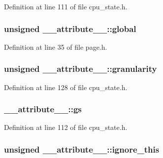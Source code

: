 \-Definition at line 111 of file cpu\-\_\-state.\-h.

\hypertarget{struct____attribute_____a64b47dff3d08e4138ce9523711ef1545}{
\subsubsection[{global}]{\setlength{\rightskip}{0pt plus 5cm}unsigned {\bf \-\_\-\-\_\-attribute\-\_\-\-\_\-\-::global}}}\label{struct____attribute_____a64b47dff3d08e4138ce9523711ef1545}


\-Definition at line 35 of file page.\-h.

\hypertarget{struct____attribute_____a06f6a9bd6e4fe0906fcc761fcba8a4e3}{
\subsubsection[{granularity}]{\setlength{\rightskip}{0pt plus 5cm}unsigned {\bf \-\_\-\-\_\-attribute\-\_\-\-\_\-\-::granularity}}}\label{struct____attribute_____a06f6a9bd6e4fe0906fcc761fcba8a4e3}


\-Definition at line 128 of file cpu\-\_\-state.\-h.

\hypertarget{struct____attribute_____a5a69d4f666af68d62d2bee047c2b534c}{
\subsubsection[{gs}]{ {\bf \-\_\-\-\_\-attribute\-\_\-\-\_\-\-::gs}}}\label{struct____attribute_____a5a69d4f666af68d62d2bee047c2b534c}


\-Definition at line 112 of file cpu\-\_\-state.\-h.

\hypertarget{struct____attribute_____a097e9473ec96eac6c0e467f6b5f21cca}{
\subsubsection[{ignore\-\_\-this}]{\setlength{\rightskip}{0pt plus 5cm}unsigned {\bf \-\_\-\-\_\-attribute\-\_\-\-\_\-\-::ignore\-\_\-this}}}\label{struct____attribute_____a097e9473ec96eac6c0e467f6b5f21cca}


